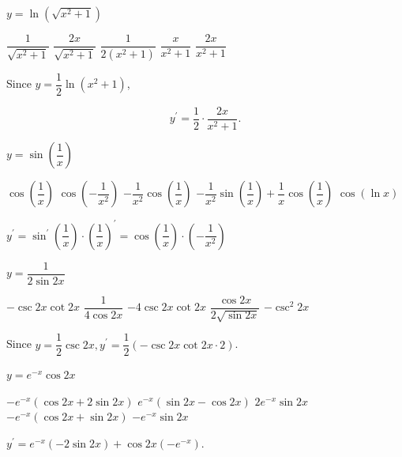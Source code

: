 \newpage


\question
$y=\ln \left(\sqrt{x^{2}+1}\right)$
\begin{choices}
  \choice $\dfrac{1}{\sqrt{x^{2}+1}}$
  \choice $\dfrac{2 x}{\sqrt{x^{2}+1}}$
  \choice $\dfrac{1}{2\left(x^{2}+1\right)}$
  \CorrectChoice $\dfrac{x}{x^{2}+1}$
  \choice $\dfrac{2 x}{x^{2}+1}$
\end{choices}
\begin{solution}
Since $y=\dfrac{1}{2} \ln \left(x^{2}+1\right)$,


\[
y^{\prime}=\dfrac{1}{2} \cdot \dfrac{2 x}{x^{2}+1} .
\]


\end{solution}

\question
$y=\sin \left(\dfrac{1}{x}\right)$
\begin{choices}
  \choice $\cos \left(\dfrac{1}{x}\right)$
  \choice $\cos \left(-\dfrac{1}{x^{2}}\right)$
  \CorrectChoice $-\dfrac{1}{x^{2}} \cos \left(\dfrac{1}{x}\right)$
  \choice $-\dfrac{1}{x^{2}} \sin \left(\dfrac{1}{x}\right)+\dfrac{1}{x} \cos \left(\dfrac{1}{x}\right)$
  \choice $\cos (\ln x)$
\end{choices}
\begin{solution}
$y^{\prime}=\sin ^{\prime}\left(\dfrac{1}{x}\right) \cdot\left(\dfrac{1}{x}\right)^{\prime}=\cos \left(\dfrac{1}{x}\right) \cdot\left(-\dfrac{1}{x^{2}}\right)$
\end{solution}

\question
$y=\dfrac{1}{2 \sin 2 x}$
\begin{choices}
  \CorrectChoice $-\csc 2 x \cot 2 x$
  \choice $\dfrac{1}{4 \cos 2 x}$
  \choice $-4 \csc 2 x \cot 2 x$
  \choice $\dfrac{\cos 2 x}{2 \sqrt{\sin 2 x}}$
  \choice $-\csc ^{2} 2 x$
\end{choices}
\begin{solution}
Since $y=\dfrac{1}{2} \csc 2 x, y^{\prime}=\dfrac{1}{2}(-\csc 2 x \cot 2 x \cdot 2)$.
\end{solution}


\newpage


\question
$y=e^{-x} \cos 2 x$
\begin{choices}
  \CorrectChoice $-e^{-x}(\cos 2 x+2 \sin 2 x)$
  \choice $e^{-x}(\sin 2 x-\cos 2 x)$
  \choice $2 e^{-x} \sin 2 x$
  \choice $-e^{-x}(\cos 2 x+\sin 2 x)$
  \choice $-e^{-x} \sin 2 x$
\end{choices}
\begin{solution}
$y^{\prime}=e^{-x}(-2 \sin 2 x)+\cos 2 x\left(-e^{-x}\right)$.
\end{solution}

